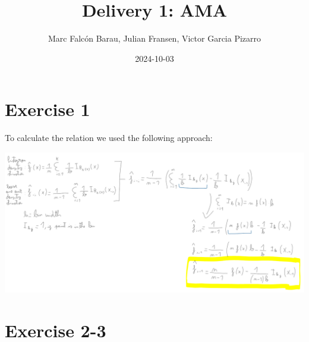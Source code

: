\documentclass[
]{article}
\title{Delivery 1: AMA}
\author{Marc Falcón Barau, Julian Fransen, Victor Garcia Pizarro}
\date{2024-10-03}
\begin{document}
\maketitle

{
\setcounter{tocdepth}{3}
\tableofcontents
}
\section{Exercise 1}\label{exercise-1}

To calculate the relation we used the following approach:

\includegraphics{Exercise_1.PNG}

\section{Exercise 2-3}\label{exercise-2-3}
\end{document}
